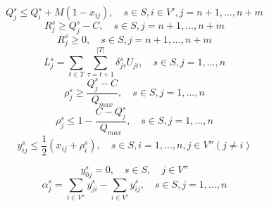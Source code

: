 \documentclass[preprint,11pt,authoryear]{elsarticle}
\begin{document}
%
\begin{equation}\label{c9.1}
    Q_j^s \leq Q_i^s + M(1-x_{ij}), \quad s \in S, i\in V', j=n+1,...,n+m 
\end{equation}
%
\begin{equation}\label{c10}
  R_j^s\geq Q_j^s - C , \quad s \in S, j=n+1,...,n+m 
\end{equation}
%
\begin{equation}\label{c11}
  R_j^s\geq 0, \quad s \in S, j=n+1,...,n+m 
\end{equation}
%
\begin{equation}\label{c12}
  L_j^s=\sum_{t\in T}\sum_{\tau=t+1}^{|T|}\delta_{j\tau}^sU_{jt}, \quad s \in S, j=1,...,n 
\end{equation}
%
\begin{equation}\label{c13}
\rho_j^s \geq \frac{Q_j^s-C}{Q_{max}}, \quad s \in S, j = 1, \ldots , n  
\end{equation}
%
\begin{equation}\label{c14}
\rho_j^s \leq 1-\frac{C-Q_j^s}{Q_{max}}, \quad s \in S, j = 1, \ldots ,n 
\end{equation}
%
\begin{equation}\label{c15}
 y_{ij}^s \leq \frac{1}{2}(x_{ij}+\rho_i^s), \quad s \in S, i=1,...,n, j \in V'' (j \neq i)
\end{equation}
%

%
\begin{equation} \label{cy}
y_{0j}^s = 0, \quad s \in S, \quad j \in V''
\end{equation}
%
\begin{equation} \label{cyalpha}
\alpha_j^s = \sum_{i \in V''}y_{ji}^s - \sum_{i \in V'}y_{ij}^s, \quad s \in S, j = 1, \ldots, n
\end{equation}   
\end{document}
